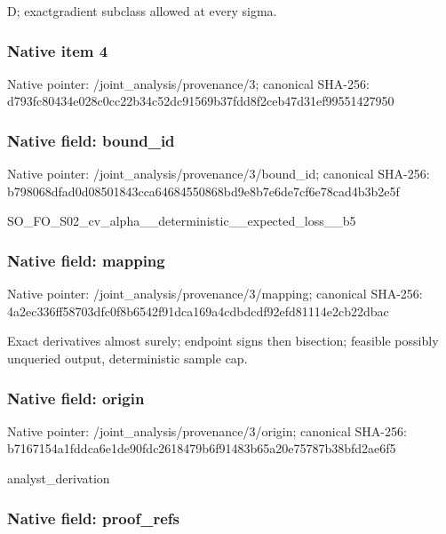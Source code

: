 \documentclass[10pt,a4paper]{article}
\begin{document}
D; exactgradient subclass allowed at every sigma.


\subsubsection{Native item 4}


Native pointer: /joint\_analysis/provenance/3; canonical SHA-256: d793fc80434e028c0cc22b34\allowbreak{}c52dc91569b37fdd8f2ceb47\allowbreak{}d31ef99551427950



\subsubsection{Native field: bound\_id}


Native pointer: /joint\_analysis/provenance/3/bound\_id; canonical SHA-256: b798068dfad0d08501843cca\allowbreak{}64684550868bd9e8b7e6de7c\allowbreak{}f6e78cad4b3b2e5f


SO\_FO\_S02\_cv\_alpha\_\_dete\allowbreak{}rministic\_\_expected\_loss\allowbreak{}\_\_b5


\subsubsection{Native field: mapping}


Native pointer: /joint\_analysis/provenance/3/mapping; canonical SHA-256: 4a2ec336ff58703dfc0f8b65\allowbreak{}42f91dca169a4cdbdcdf92ef\allowbreak{}d81114e2cb22dbac


Exact derivatives almost surely; endpoint signs then bisection; feasible possibly unqueried output, deterministic sample cap.


\subsubsection{Native field: origin}


Native pointer: /joint\_analysis/provenance/3/origin; canonical SHA-256: b7167154a1fddca6e1de90fd\allowbreak{}c2618479b6f91483b65a20e7\allowbreak{}5787b38bfd2ae6f5


analyst\_derivation


\subsubsection{Native field: proof\_refs}
\end{document}

